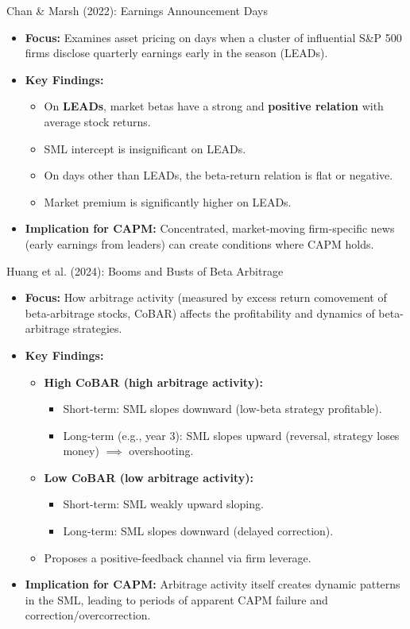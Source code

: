 \documentclass[10pt]{beamer}
\begin{document}
\begin{frame}{Chan \& Marsh (2022): Earnings Announcement Days}
  \begin{itemize}
    \item \textbf{Focus:} Examines asset pricing on days when a cluster of influential S\&P 500 firms disclose quarterly earnings early in the season (LEADs).
    \item \textbf{Key Findings:}
    \begin{itemize}
        \item On \textbf{LEADs}, market betas have a strong and \textbf{positive relation} with average stock returns.
        \item SML intercept is insignificant on LEADs.
        \item On days other than LEADs, the beta-return relation is flat or negative.
        \item Market premium is significantly higher on LEADs.
    \end{itemize}
    \item \textbf{Implication for CAPM:} Concentrated, market-moving firm-specific news (early earnings from leaders) can create conditions where CAPM holds.
  \end{itemize}
\end{frame}

\begin{frame}{Huang et al. (2024): Booms and Busts of Beta Arbitrage}
  \begin{itemize}
    \item \textbf{Focus:} How arbitrage activity (measured by excess return comovement of beta-arbitrage stocks, CoBAR) affects the profitability and dynamics of beta-arbitrage strategies.
    \item \textbf{Key Findings:}
    \begin{itemize}
        \item \textbf{High CoBAR (high arbitrage activity):}
        \begin{itemize}
            \item Short-term: SML slopes downward (low-beta strategy profitable).
            \item Long-term (e.g., year 3): SML slopes upward (reversal, strategy loses money) $\implies$ overshooting.
        \end{itemize}
        \item \textbf{Low CoBAR (low arbitrage activity):}
        \begin{itemize}
            \item Short-term: SML weakly upward sloping.
            \item Long-term: SML slopes downward (delayed correction).
        \end{itemize}
        \item Proposes a positive-feedback channel via firm leverage.
    \end{itemize}
    \item \textbf{Implication for CAPM:} Arbitrage activity itself creates dynamic patterns in the SML, leading to periods of apparent CAPM failure and correction/overcorrection.
  \end{itemize}
\end{frame}
\end{document}
